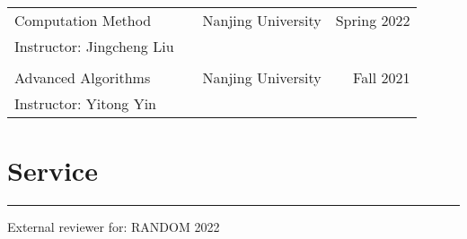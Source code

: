 \documentclass{article}
\begin{document}
\begin{tabularx}{\textwidth}{@{\hskip 0pt}lXrr@{\hskip 0pt}}
  \large Computation Method & & Nanjing University & Spring 2022 \\
  Instructor: Jingcheng Liu \\
  \\
  \large Advanced Algorithms & & Nanjing University & Fall 2021 \\ 
  Instructor: Yitong Yin
\end{tabularx}

\section*{Service}
\vspace{-1em} \hrule \vspace{1em}

External reviewer for: RANDOM 2022
\end{document}
